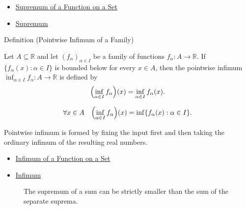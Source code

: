 \begin{dependencies}
\begin{itemize}
  \item \hyperref[def:function-supremum-on-set]{Supremum of a Function on a Set}
  \item \hyperref[def:supremum]{Supremum}
\end{itemize}
\end{dependencies}

\begin{definitionbox}{Definition (Pointwise Infimum of a Family)}
\begin{definition}
\label{def:pointwise-infimum-family}
Let \(A\subseteq\mathbb{R}\) and let \((f_\alpha)_{\alpha\in I}\) be a
family of functions \(f_\alpha:A\to\mathbb{R}\).  If
\(\{f_\alpha(x):\alpha\in I\}\) is bounded below for every \(x\in A\), then
the pointwise infimum \(\inf_{\alpha\in I} f_\alpha:A\to\mathbb{R}\) is
defined by
\[
  \Bigl(\inf_{\alpha\in I} f_\alpha\Bigr)(x)
  =
  \inf_{\alpha\in I} f_\alpha(x).
\]
\end{definition}
\end{definitionbox}

\begin{remark*}
\[
  \forall x\in A\quad
  \Bigl(\inf_{\alpha\in I} f_\alpha\Bigr)(x)
  =
  \inf\{f_\alpha(x):\alpha\in I\}.
\]
\end{remark*}

\begin{remark*}[Interpretation]
Pointwise infimum is formed by fixing the input first and then taking the
ordinary infimum of the resulting real numbers.
\end{remark*}

\begin{dependencies}
\begin{itemize}
  \item \hyperref[def:function-infimum-on-set]{Infimum of a Function on a Set}
  \item \hyperref[def:infimum]{Infimum}
\end{itemize}
\end{dependencies}

\begin{figure}[htbp]
\centering

\caption{The supremum of a sum can be strictly smaller than the sum of the separate suprema.}
\label{fig:sup-subadditivity-strict}
\end{figure}

